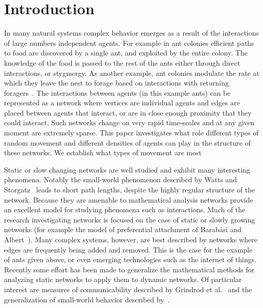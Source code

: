 \documentclass[conference]{IEEEtran}
\begin{document}
\section{Introduction}
\label{sec:intro}
In many natural systems complex behavior emerges as a result of the
interactions of large numbers independent agents. For example in ant
colonies efficient paths to food are discovered by a single ant, and
exploited by the entire colony. The knowledge of the food is passed to
the rest of the ants either through direct interactions, or
stygmergy. As another example, ant colonies modulate the rate at which
they leave the nest to forage based on interactions with returning
foragers~\cite{Pinter2013}. The interactions between agents (in this
example ants) can be represented as a network where vertices are
individual agents and edges are placed between agents that interact,
or are in close enough proximity that they could interact. Such
networks change on very rapid time-scales and at any given moment are
extremely sparse. This paper investigates what role different types of
random movement and different densities of agents can play in the
structure of these networks. We establish what types of movement are
most 

Static or slow changing networks are well studied and exhibit many
interesting phenomena. Notably the small-world phenomenon described by
Watts and Storgatz~\cite{Watts1998} leads to short path lengths,
despite the highly regular structure of the network. Because they are
amenable to mathematical analysis networks provide an excellent model
for studying phenomena such as interactions. Much of the research
investigating networks is focused on the case of static or slowly
growing networks (for example the model of preferential attachment of
Barab\'asi and Albert~\cite{Barabasi1999}). Many complex systems,
however, are best described by networks where edges are frequently
being added and removed. This is the case for the example of ants
given above, or even emerging technologies such as the internet of
things. Recently some effort has been made to generalize the
mathematical methods for analyzing static networks to apply them to
dynamic networks. Of particular interest are measures of
communicability described by Grindrod et al.~\cite{Grindrod2011} and
the generalization of small-world behavior described
by~\cite{Tang2010}.
\end{document}
